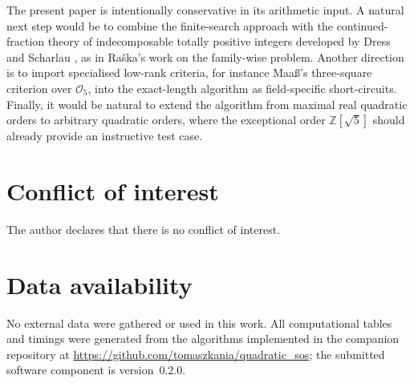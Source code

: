 \documentclass[manuscript,screen]{acmart}
\theoremstyle{plain}
\theoremstyle{definition}
\theoremstyle{nonitalicremark}
\newcommand{\Z}{\mathbb{Z}}
\newcommand{\OO}{\mathcal{O}}
\begin{document}
The present paper is intentionally conservative in its arithmetic input. A natural next step would
be to combine the finite-search approach with the continued-fraction theory of indecomposable
totally positive integers developed by Dress and Scharlau \cite{DressScharlau}, as in Ra\v ska's
work on the family-wise problem. Another direction is to import specialised low-rank criteria,
for instance Maa\ss's three-square criterion over $\OO_5$, into the exact-length algorithm as
field-specific short-circuits. Finally, it would be natural to extend the algorithm from maximal
real quadratic orders to arbitrary quadratic orders, where the exceptional order $\Z[\sqrt5]$
should already provide an instructive test case.

\section*{Conflict of interest}
The author declares that there is no conflict of interest.

\section*{Data availability}
No external data were gathered or used in this work. All computational tables and timings were
generated from the algorithms implemented in the companion repository at
\url{https://github.com/tomaszkania/quadratic_sos}; the submitted software component is version~0.2.0.



\end{document}
